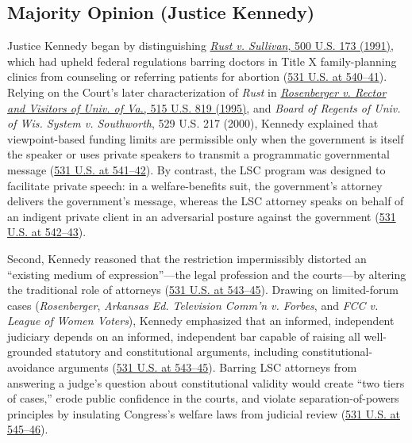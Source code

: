 \documentclass[12pt]{article}
\begin{document}
\subsection{Majority Opinion (Justice Kennedy)}
Justice Kennedy began by distinguishing \href{https://supreme.justia.com/cases/federal/us/500/173/}{\textit{Rust v. Sullivan}, 500 U.S. 173 (1991)}, which had upheld federal regulations barring doctors in Title X family-planning clinics from counseling or referring patients for abortion (\href{https://supreme.justia.com/cases/federal/us/531/533/}{531 U.S. at 540--41}). Relying on the Court's later characterization of \textit{Rust} in \href{https://supreme.justia.com/cases/federal/us/515/819/}{\textit{Rosenberger v. Rector and Visitors of Univ. of Va.}, 515 U.S. 819 (1995)}, and \textit{Board of Regents of Univ. of Wis. System v. Southworth}, 529 U.S. 217 (2000), Kennedy explained that viewpoint-based funding limits are permissible only when the government is itself the speaker or uses private speakers to transmit a programmatic governmental message (\href{https://supreme.justia.com/cases/federal/us/531/533/}{531 U.S. at 541--42}). By contrast, the LSC program was designed to facilitate private speech: in a welfare-benefits suit, the government's attorney delivers the government's message, whereas the LSC attorney speaks on behalf of an indigent private client in an adversarial posture against the government (\href{https://supreme.justia.com/cases/federal/us/531/533/}{531 U.S. at 542--43}).

Second, Kennedy reasoned that the restriction impermissibly distorted an ``existing medium of expression''---the legal profession and the courts---by altering the traditional role of attorneys (\href{https://supreme.justia.com/cases/federal/us/531/533/}{531 U.S. at 543--45}). Drawing on limited-forum cases (\textit{Rosenberger}, \textit{Arkansas Ed. Television Comm'n v. Forbes}, and \textit{FCC v. League of Women Voters}), Kennedy emphasized that an informed, independent judiciary depends on an informed, independent bar capable of raising all well-grounded statutory and constitutional arguments, including constitutional-avoidance arguments (\href{https://supreme.justia.com/cases/federal/us/531/533/}{531 U.S. at 543--45}). Barring LSC attorneys from answering a judge's question about constitutional validity would create ``two tiers of cases,'' erode public confidence in the courts, and violate separation-of-powers principles by insulating Congress's welfare laws from judicial review (\href{https://supreme.justia.com/cases/federal/us/531/533/}{531 U.S. at 545--46}).
\end{document}
